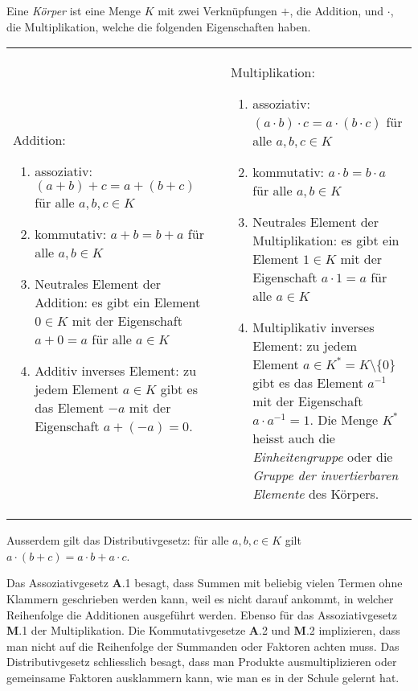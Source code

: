 \begin{definition}
\label{buch:integral:definition:koerper}
Eine {\em Körper} ist eine Menge $K$ mit zwei Verknüpfungen $+$, die Addition,
und $\cdot$, die Multiplikation,
welche die folgenden Eigenschaften haben.
\begin{center}
\renewcommand{\tabcolsep}{0pt}
\begin{tabular}{p{68mm}p{4mm}p{68mm}}
Addition:
\begin{enumerate}[{\bf A}.1)]
\item assoziativ: $(a+b)+c=a+(b+c)$
für alle $a,b,c\in K$
\item kommutativ: $a+b=b+a$
für alle $a,b\in K$
\item Neutrales Element der Addition: es gibt ein Element $0\in K$ mit
der Eigenschaft $a+0=a$ für alle $a\in K$
\item Additiv inverses Element: zu jedem Element $a\in K$ gibt es das Element
$-a$ mit der Eigenschaft $a+(-a)=0$.
\end{enumerate}
&&%
Multiplikation:
\begin{enumerate}[{\bf M}.1)]
\item assoziativ: $(a\cdot b)\cdot c=a\cdot (b\cdot c)$
für alle $a,b,c\in K$
\index{Assoziativgesetz}%
\index{assoziativ}%
\item kommutativ: $a\cdot b=b\cdot a$
für alle $a,b\in K$
\index{Kommutativgesetz}%
\index{kommutativ}%
\item Neutrales Element der Multiplikation: es gibt ein Element $1\in K$ mit
der Eigenschaft $a\cdot 1 =a$ für alle $a\in K$
\index{neutrales Element}%
\item Multiplikativ inverses Element: zu jedem Element
\index{inverses Element}%
$a\in K^*=K\setminus\{0\}$
gibt es das Element $a^{-1}$ mit der Eigenschaft $a\cdot a^{-1}=1$.
Die Menge $K^*$ heisst auch die {\em Einheitengruppe} oder die
{\em Gruppe der invertierbaren Elemente} des Körpers.
\index{Einheitengruppe}%
\index{Gruppe der invertierbaren Elemente}%
\end{enumerate}
\end{tabular}
\end{center}
\vspace{-10pt}
Ausserdem gilt das Distributivgesetz: für alle $a,b,c\in K$ gilt
$a\cdot(b+c)=a\cdot b + a\cdot c$.
%
\end{definition}

Das Assoziativgesetz {\bf A}.1 besagt, dass Summen mit beliebig
vielen Termen ohne Klammern geschrieben werden kann, weil es nicht
darauf ankommt, in welcher Reihenfolge die Additionen ausgeführt werden.
Ebenso für das Assoziativgesetz {\bf M}.1 der Multiplikation.
Die Kommutativgesetze {\bf A}.2 und {\bf M}.2 implizieren, dass man
nicht auf die Reihenfolge der Summanden oder Faktoren achten muss.
Das Distributivgesetz schliesslich besagt, dass man Produkte ausmultiplizieren
oder gemeinsame Faktoren ausklammern kann, wie man es in der Schule
gelernt hat.

